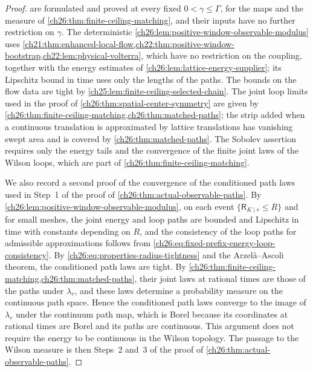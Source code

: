 \begin{proof}
 are formulated and proved at every fixed $0<\gamma\le\Gamma$, for the maps and the measure of \cref{ch26:thm:finite-ceiling-matching}, and their inputs have no further restriction on $\gamma$. The deterministic \cref{ch26:lem:positive-window-observable-modulus} uses \cref{ch21:thm:enhanced-local-flow,ch22:thm:positive-window-bootstrap,ch22:lem:physical-volterra}, which have no restriction on the coupling, together with the energy estimates of \cref{ch26:lem:lattice-energy-supplier}; its Lipschitz bound in time uses only the lengths of the paths. The bounds on the flow data are tight by \cref{ch25:lem:finite-ceiling-selected-chain}. The joint loop limits used in the proof of \cref{ch26:thm:spatial-center-symmetry} are given by \cref{ch26:thm:finite-ceiling-matching,ch26:thm:matched-paths}; the strip added when a continuous translation is approximated by lattice translations has vanishing swept area and is covered by \cref{ch26:thm:matched-paths}. The Sobolev assertion requires only the energy tails and the convergence of the finite joint laws of the Wilson loops, which are part of \cref{ch26:thm:finite-ceiling-matching}.

We also record a second proof of the convergence of the conditioned path laws used in Step~1 of the proof of \cref{ch26:thm:actual-observable-paths}. By \cref{ch26:lem:positive-window-observable-modulus}, on each event $\{\mathsf R_{K\mid r}\le R\}$ and for small meshes, the joint energy and loop paths are bounded and Lipschitz in time with constants depending on $R$, and the consistency of the loop paths for admissible approximations follows from \eqref{ch26:eq:fixed-prefix-energy-loop-consistency}. By \eqref{ch26:eq:properties-radius-tightness} and the Arzel\`a--Ascoli theorem, the conditioned path laws are tight. By \cref{ch26:thm:finite-ceiling-matching,ch26:thm:matched-paths}, their joint laws at rational times are those of the paths under $\lambda_r$, and these laws determine a probability measure on the continuous path space. Hence the conditioned path laws converge to the image of $\lambda_r$ under the continuum path map, which is Borel because its coordinates at rational times are Borel and its paths are continuous. This argument does not require the energy to be continuous in the Wilson topology. The passage to the Wilson measure is then Steps~2 and~3 of the proof of \cref{ch26:thm:actual-observable-paths}.
\end{proof}

